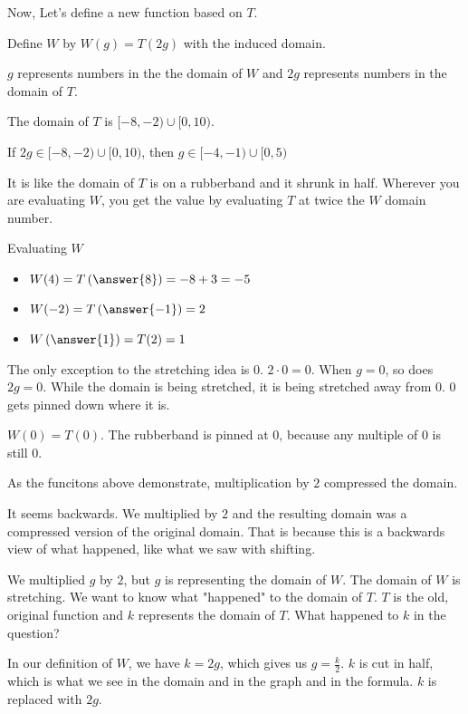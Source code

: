 \documentclass{ximera}
\begin{document}
Now, Let's define a new function based on $T$.



Define $W$ by $W(g) = T(2g)$ with the induced domain.



$g$ represents numbers in the the domain of $W$ and $2g$ represents numbers in the domain of $T$.  

The domain of $T$ is $[-8,-2) \cup [0,10)$.


If $2g \in [-8,-2) \cup [0,10)$, then $g \in [-4,-1) \cup [0,5)$

It is like the domain of $T$ is on a rubberband and it shrunk in half. Wherever you are evaluating $W$, you get the value by evaluating $T$ at twice the $W$ domain number.



\begin{example}  Evaluating $W$

\begin{itemize}
\item $W(4) = T\left(\answer{8}\right) = -8+3=-5$
\item $W(-2) = T\left(\answer{-1}\right) = 2$
\item $W\left(\answer{1}\right) = T(2) = 1$
\end{itemize}


\end{example}


The only exception to the stretching idea is $0$.  $2 \cdot 0 = 0$.  When $g = 0$, so does $2g = 0$.  While the domain is being stretched, it is being stretched away from $0$. $0$ gets pinned down where it is.


$W(0) = T(0)$.  The rubberband is pinned at $0$, because any multiple of $0$ is still $0$.  

As the funcitons above demonstrate, multiplication by $2$ compressed the domain.

It seems backwards.  We multiplied by $2$ and the resulting domain was a compressed version of the original domain.  That is because this is a backwards view of what happened, like what we saw with shifting.



We multiplied $g$ by $2$, but $g$ is representing the domain of $W$.  The domain of $W$ is stretching.  We want to know what "happened" to the domain of $T$.  $T$ is the old, original function and $k$ represents the domain of $T$.  What happened to $k$ in the question?

In our definition of $W$, we have $k=2g$, which gives us $g=\frac{k}{2}$.  $k$ is cut in half, which is what we see in the domain and in the graph and in the formula.  $k$ is replaced with $2g$.
\end{document}
